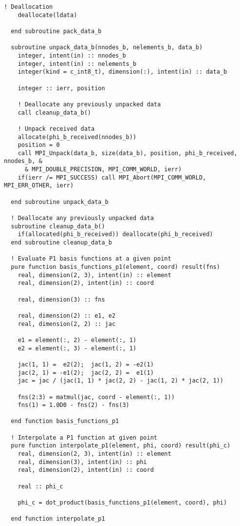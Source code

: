 \documentclass{article}
\begin{document}
\begin{lstlisting}[language=FORTRAN]
    ! Deallocation
    deallocate(ldata)
    
  end subroutine pack_data_b

  subroutine unpack_data_b(nnodes_b, nelements_b, data_b)
    integer, intent(in) :: nnodes_b
    integer, intent(in) :: nelements_b
    integer(kind = c_int8_t), dimension(:), intent(in) :: data_b

    integer :: ierr, position

    ! Deallocate any previously unpacked data
    call cleanup_data_b()

    ! Unpack received data
    allocate(phi_b_received(nnodes_b))
    position = 0
    call MPI_Unpack(data_b, size(data_b), position, phi_b_received, nnodes_b, &
      & MPI_DOUBLE_PRECISION, MPI_COMM_WORLD, ierr)
    if(ierr /= MPI_SUCCESS) call MPI_Abort(MPI_COMM_WORLD, MPI_ERR_OTHER, ierr)

  end subroutine unpack_data_b

  ! Deallocate any previously unpacked data
  subroutine cleanup_data_b()
    if(allocated(phi_b_received)) deallocate(phi_b_received)
  end subroutine cleanup_data_b
  
  ! Evaluate P1 basis functions at a given point
  pure function basis_functions_p1(element, coord) result(fns)
    real, dimension(2, 3), intent(in) :: element
    real, dimension(2), intent(in) :: coord

    real, dimension(3) :: fns

    real, dimension(2) :: e1, e2
    real, dimension(2, 2) :: jac
        
    e1 = element(:, 2) - element(:, 1)
    e2 = element(:, 3) - element(:, 1)

    jac(1, 1) =  e2(2);  jac(1, 2) = -e2(1)
    jac(2, 1) = -e1(2);  jac(2, 2) =  e1(1)
    jac = jac / (jac(1, 1) * jac(2, 2) - jac(1, 2) * jac(2, 1))

    fns(2:3) = matmul(jac, coord - element(:, 1))
    fns(1) = 1.0D0 - fns(2) - fns(3)

  end function basis_functions_p1

  ! Interpolate a P1 function at given point
  pure function interpolate_p1(element, phi, coord) result(phi_c)
    real, dimension(2, 3), intent(in) :: element
    real, dimension(3), intent(in) :: phi
    real, dimension(2), intent(in) :: coord

    real :: phi_c

    phi_c = dot_product(basis_functions_p1(element, coord), phi)

  end function interpolate_p1
  

\end{lstlisting}
\end{document}
